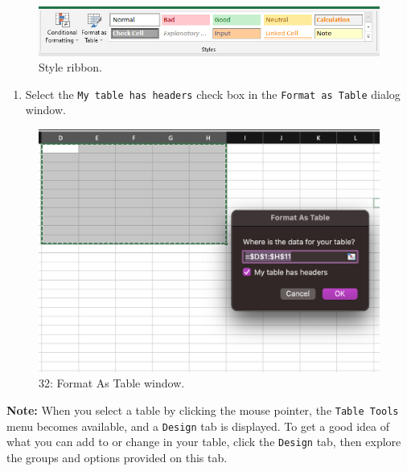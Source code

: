 \documentclass[
  12pt,
  letterpaper,
]{book}
\providecommand{\tightlist}{%
  \setlength{\itemsep}{0pt}\setlength{\parskip}{0pt}}
\begin{document}
\begin{figure}

{\centering \includegraphics[width=0.9\linewidth]{images/style-pc} 

}

\caption{Style ribbon.}\label{fig:table-style-group}
\end{figure}

\begin{enumerate}
\def\labelenumi{\arabic{enumi}.}
\setcounter{enumi}{2}
\tightlist
\item
  Select the \texttt{My\ table\ has\ headers} check box in the \texttt{Format\ as\ Table} dialog window.
\end{enumerate}

\begin{figure}

{\centering \includegraphics[width=0.7\linewidth]{images/format-table} 

}

\caption{32: Format As Table window.}\label{fig:format-as-table}
\end{figure}

\textbf{Note:} When you select a table by clicking the mouse pointer, the \texttt{Table\ Tools} menu becomes available, and a \texttt{Design} tab is displayed. To get a good idea of what you can add to or change in your table, click the \texttt{Design} tab, then explore the groups and options provided on this tab.
\end{document}
